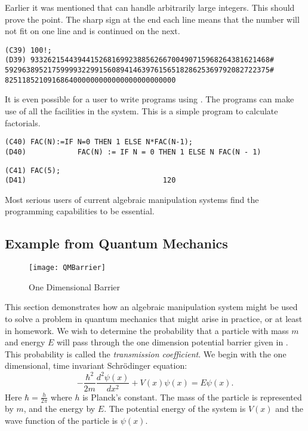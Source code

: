 Earlier it was mentioned that {\Macsyma} can handle arbitrarily large integers.
This should prove the point.  The sharp sign 
at the end each line means that
the number will not fit on one line and is continued on the next.
\begin{verbatim}
(C39) 100!;
(D39) 93326215443944152681699238856266700490715968264381621468#
59296389521759999322991560894146397615651828625369792082722375#
8251185210916864000000000000000000000000
\end{verbatim}
It is even possible for a user to write programs using {\Macsyma}.  The
programs can make use of all the facilities in the {\Macsyma} system.
This is a simple program to calculate factorials.
\begin{verbatim}
(C40) FAC(N):=IF N=0 THEN 1 ELSE N*FAC(N-1);
(D40)            FAC(N) := IF N = 0 THEN 1 ELSE N FAC(N - 1)
\end{verbatim}

\begin{verbatim}
(C41) FAC(5);
(D41)                                120
\end{verbatim}
Most serious users of current algebraic manipulation systems find the
programming capabilities to be essential.


\subsection{Example from Quantum Mechanics}
\label{Quantum:Ex:Sec}

\begin{figure}
\begin{center}
\texttt{[image: QMBarrier]}
\end{center}
\caption{One Dimensional Barrier\label{QMBarrier:Fig}}
\end{figure}

This section demonstrates how an algebraic manipulation system might
be used to solve a problem in quantum mechanics that might arise in
practice, or at least in homework.  We wish to determine the
probability that a particle with mass $m$ and energy $E$ will pass
through the one dimension potential barrier given in
.  This probability is called the {\em
transmission coefficient\/}.  We begin with the one dimensional, time
invariant Schr\"odinger equation:
\[
- \frac{\hbar^2}{2 m} \frac{d^2 \psi(x)}{dx^2} + V(x) \psi(x) = E
\psi(x).
\]
Here $\hbar = \frac{h}{2 \pi}$ where $h$ is Planck's constant.  The
mass of the particle is represented by $m$, and the energy by $E$.
The potential energy of the system is $V(x)$ and the wave function of
the particle is $\psi(x)$.

